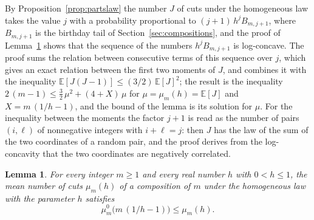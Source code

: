 \documentclass{amsart}
\newtheorem{lemma}[theorem]{Lemma}
\theoremstyle{definition}
\theoremstyle{remark}
\numberwithin{equation}{section}
\begin{document}
By Proposition~\ref{prop:partslaw} the number $J$ of cuts under the
homogeneous law takes the value $j$ with a probability proportional to
$(j+1)\,h^{j}B_{m,j+1}$, where $B_{m,j+1}$ is the birthday tail of
Section~\ref{sec:compositions}, and the proof of Lemma~\ref{lem:meancuts}
shows that the sequence of the numbers $h^{j}B_{m,j+1}$ is log-concave. The
proof sums the relation between consecutive terms of this sequence over
$j$, which gives an exact relation between the first two moments of $J$, and
combines it with the inequality
$\mathbb E[J(J-1)]\le(3/2)\,\mathbb E[J]^2$; the result is the inequality
$2\,(m-1)\le\tfrac32\,\mu^2+(4+X)\,\mu$ for $\mu=\mu_m(h)=\mathbb E[J]$ and
$X=m\,(1/h-1)$, and the bound of the lemma is its solution for $\mu$. For the
inequality between the moments the factor $j+1$ is read as the number of
pairs $(i,\ell)$ of nonnegative integers with $i+\ell=j$: then $J$ has the
law of the sum of the two coordinates of a random pair, and the proof
derives from the log-concavity that the two coordinates are negatively
correlated.

\begin{lemma}\label{lem:meancuts}
For every integer $m\ge1$ and every real number $h$ with $0<h\le1$, the mean
number of cuts $\mu_m(h)$ of a composition of $m$ under the homogeneous law
with the parameter $h$ satisfies
\[
\mu^0_m\bigl(m\,(1/h-1)\bigr)\le\mu_m(h).
\]
\end{lemma}
\end{document}
